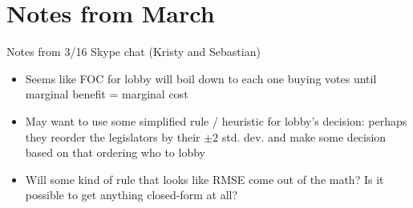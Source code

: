 \documentclass[12pt]{article}
\begin{document}
				  
\newpage		
\section{Notes from March}
Notes from 3/16 Skype chat (Kristy and Sebastian)
\begin{itemize}
	\item Seems like FOC for lobby will boil down to each one buying votes until marginal benefit = marginal cost
	\item May want to use some simplified rule / heuristic for lobby's decision: perhaps they reorder the legislators by their $\pm 2$ std. dev. and make some decision based on that ordering who to lobby
	\item Will some kind of rule that looks like RMSE come out of the math? Is it possible to get anything closed-form at all?
\end{itemize}
\end{document}
